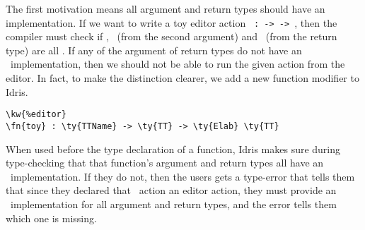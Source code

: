 The first motivation means all argument and return types should have an
 implementation. If we want to write a toy editor action
\texttt{ :  ->  ->  },
then the compiler must check if , \TT\ (from the second argument)
and \TT\ (from the return type) are all \Editorable. If any of the argument of
return types do not have an \Editorable\ implementation, then we should not be
able to run the given action from the editor. In fact, to make the distinction
clearer, we add a new function modifier  to Idris.

\begin{Verbatim}[framesep=2mm, label=\footnotesize{\normalfont{Idris}}, labelposition=topline]
\kw{%editor}
\fn{toy} : \ty{TTName} -> \ty{TT} -> \ty{Elab} \ty{TT}
\end{Verbatim}

When used before the type declaration of a function, Idris makes sure during
type-checking that that function's argument and return types all have an
\Editorable\ implementation. If they do not, then the users gets a type-error
that tells them that since they declared that \Elab\ action an editor action,
they must provide an \Editorable\ implementation for all argument and return
types, and the error tells them which one is missing.

